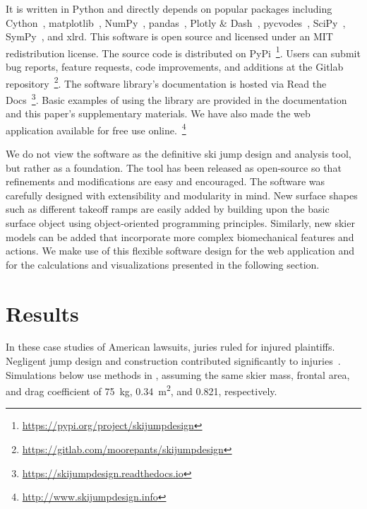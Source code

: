 \documentclass[smallextended]{svjour3}       %
\begin{document}
It is written in Python and directly depends on popular packages
including Cython~\cite{Behnel2011}, matplotlib~\cite{Hunter2007},
NumPy~\cite{Oliphant2006}, pandas~\cite{McKinney2020}, Plotly \&
Dash~\cite{Plotly2015}, pycvodes~\cite{Dahlgren2018},
SciPy~\cite{Virtanen2020}, SymPy~\cite{Meurer2017}, and xlrd. This software is
open source and licensed under an MIT redistribution license. The source code
is distributed on PyPi~\footnote{\url{https://pypi.org/project/skijumpdesign}}.
Users can submit bug reports, feature requests, code improvements, and
additions at the Gitlab
repository~\footnote{\url{https://gitlab.com/moorepants/skijumpdesign}}. The
software library's documentation is hosted via Read the
Docs~\footnote{\url{https://skijumpdesign.readthedocs.io}}.  Basic examples of
using the library are provided in the documentation and this paper's
supplementary materials. We have also made the web application available for free use online.~\footnote{
\url{http://www.skijumpdesign.info}}

We do not view the software as the definitive ski jump design and analysis
tool, but rather as a foundation. The tool has been released as open-source so
that refinements and modifications are easy and encouraged. The software was
carefully designed with extensibility and modularity in mind. New surface
shapes such as different takeoff ramps are easily added by building upon the
basic surface object using object-oriented programming principles. Similarly,
new skier models can be added that incorporate more complex biomechanical
features and actions. We make use of this flexible software design for the web
application and for the calculations and visualizations presented in the
following section.

\section{Results}
\label{sec:case}
%
In these case studies of American lawsuits, juries ruled for injured
plaintiffs. Negligent jump design and construction contributed significantly to
injuries~\cite{SuperiorCourtSanFranciscoCounty2002,KingCountySuperiorCourt2008}.
Simulations below use methods in \cite{Levy2015}, assuming the same skier mass,
frontal area, and drag coefficient of 75~\si{\kg}, 0.34~\si{\meter\squared},
and 0.821, respectively.
\end{document}
